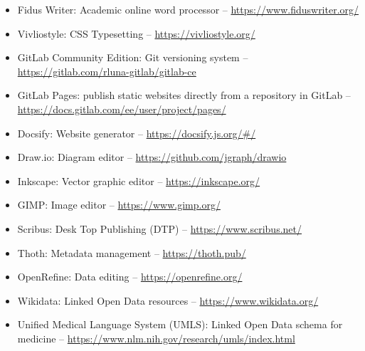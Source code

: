 \documentclass{article}
\begin{document}
\begin{itemize}
\item Fidus Writer: Academic online word processor – \href{https://www.fiduswriter.org/}{https://www.fiduswriter.org/} 


\item Vivliostyle: CSS Typesetting – \href{https://vivliostyle.org/ }{https://vivliostyle.org/ }


\item GitLab Community Edition: Git versioning system – \href{https://gitlab.com/rluna-gitlab/gitlab-ce}{https://gitlab.com/rluna-gitlab/gitlab-ce}


\item GitLab Pages: publish static websites directly from a repository in GitLab – \href{https://docs.gitlab.com/ee/user/project/pages/}{https://docs.gitlab.com/ee/user/project/pages/} 


\item Docsify: Website generator – \href{https://docsify.js.org/#/}{https://docsify.js.org/\#/} 


\item Draw.io: Diagram editor – \href{https://github.com/jgraph/drawio}{https://github.com/jgraph/drawio}


\item Inkscape: Vector graphic editor – \href{https://inkscape.org/}{https://inkscape.org/}


\item GIMP: Image editor – \href{https://www.gimp.org/}{https://www.gimp.org/}


\item Scribus: Desk Top Publishing (DTP) – \href{https://www.scribus.net/}{https://www.scribus.net/}


\item Thoth: Metadata management – \href{https://thoth.pub/}{https://thoth.pub/}


\item OpenRefine: Data editing – \href{https://openrefine.org/}{https://openrefine.org/}


\item Wikidata: Linked Open Data resources – \href{https://www.wikidata.org/}{https://www.wikidata.org/}


\item Unified Medical Language System (UMLS): Linked Open Data schema for medicine – \href{https://www.nlm.nih.gov/research/umls/index.html }{https://www.nlm.nih.gov/research/umls/index.html}



\end{itemize}
\end{document}
